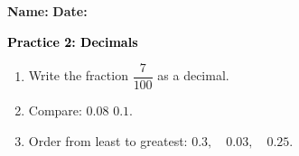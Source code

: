 \documentclass[12pt, letterpaper, fleqn]{article}
\newcommand{\blank}{\underline{\hspace{2.2cm}}}
\begin{document}
\textbf{Name:} \underline{\hspace{5cm}}
\hfill
\textbf{Date:} \underline{\hspace{3cm}}\\

\begin{tcolorbox}[colback=customteal!20]
    \large\textcolor{black}{\textbf{Practice 2: Decimals}}
\end{tcolorbox}
\begin{enumerate}[itemsep=3.5cm, leftmargin=0.6cm]
\item Write the fraction $\dfrac{7}{100}$ as a decimal.
\vspace{3.5cm}
\item Compare: $0.08$ \blank $0.1$.
\vspace{3.5cm}
\item Order from least to greatest: $0.3, \quad 0.03, \quad 0.25$.
\end{enumerate}
\end{document}
